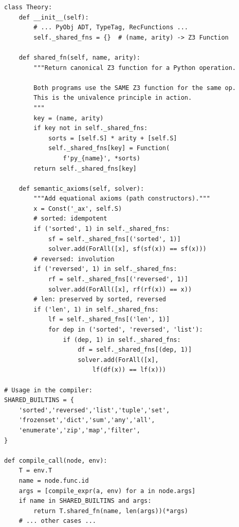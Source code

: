\begin{lstlisting}[caption={Shared function registry: complete implementation}]
class Theory:
    def __init__(self):
        # ... PyObj ADT, TypeTag, RecFunctions ...
        self._shared_fns = {}  # (name, arity) -> Z3 Function

    def shared_fn(self, name, arity):
        """Return canonical Z3 function for a Python operation.

        Both programs use the SAME Z3 function for the same op.
        This is the univalence principle in action.
        """
        key = (name, arity)
        if key not in self._shared_fns:
            sorts = [self.S] * arity + [self.S]
            self._shared_fns[key] = Function(
                f'py_{name}', *sorts)
        return self._shared_fns[key]

    def semantic_axioms(self, solver):
        """Add equational axioms (path constructors)."""
        x = Const('_ax', self.S)
        # sorted: idempotent
        if ('sorted', 1) in self._shared_fns:
            sf = self._shared_fns[('sorted', 1)]
            solver.add(ForAll([x], sf(sf(x)) == sf(x)))
        # reversed: involution
        if ('reversed', 1) in self._shared_fns:
            rf = self._shared_fns[('reversed', 1)]
            solver.add(ForAll([x], rf(rf(x)) == x))
        # len: preserved by sorted, reversed
        if ('len', 1) in self._shared_fns:
            lf = self._shared_fns[('len', 1)]
            for dep in ('sorted', 'reversed', 'list'):
                if (dep, 1) in self._shared_fns:
                    df = self._shared_fns[(dep, 1)]
                    solver.add(ForAll([x],
                        lf(df(x)) == lf(x)))

# Usage in the compiler:
SHARED_BUILTINS = {
    'sorted','reversed','list','tuple','set',
    'frozenset','dict','sum','any','all',
    'enumerate','zip','map','filter',
}

def compile_call(node, env):
    T = env.T
    name = node.func.id
    args = [compile_expr(a, env) for a in node.args]
    if name in SHARED_BUILTINS and args:
        return T.shared_fn(name, len(args))(*args)
    # ... other cases ...
\end{lstlisting}

